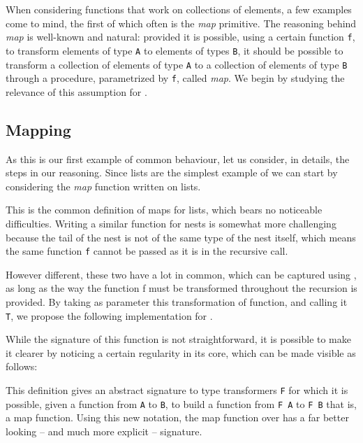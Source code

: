 \documentclass[a4paper,UKenglish,cleveref, autoref, thm-restate]{lipics}
\begin{document}
When considering functions that work on collections of elements, a few examples come to mind, the first of which often is the \textit{map} primitive. The reasoning behind \textit{map} is well-known and natural: provided it is possible, using a certain function \texttt{f}, to transform elements of type \texttt{A} to elements of types \texttt{B}, it should be possible to transform a collection of elements of type \texttt{A} to a collection of elements of type \texttt{B} through a procedure, parametrized by \texttt{f}, called \textit{map}. We begin by studying the relevance of this assumption for \linears.

\subsection{Mapping \linears}\label{ssec:maps}

 As this is our first example of common behaviour, let us consider, in details, the steps in our reasoning. Since lists are the simplest example of \linear we can start by considering the \textit{map} function written on lists.

\listmap

This is the common definition of maps for lists, which bears no noticeable difficulties. Writing a similar function for nests is somewhat more challenging because the tail of the nest is not of the same type of the nest itself, which means the same function \texttt{f} cannot be passed as it is in the recursive call.

\nestmap

However different, these two have a lot in common, which can be captured using \linears, as long as the way the function f must be transformed throughout the recursion is provided. By taking as parameter this transformation of function, and calling it \texttt{T}, we propose the following implementation for \linears.

\lndtmapz

While the signature of this function is not straightforward, it is possible to make it clearer by noticing a certain regularity in its core, which can be made visible as follows:

\mappable

This definition gives an abstract signature to type transformers \texttt{F} for which it is possible, given a function from \texttt{A} to \texttt{B}, to build a function from \texttt{F A} to \texttt{F B} that is, a map function. Using this new notation, the map function over \linears has a far better looking -- and much more explicit -- signature.
\end{document}
